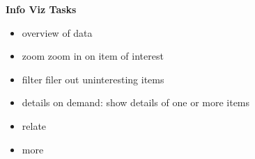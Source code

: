 \documentclass[]{article}
\begin{document}
\textbf{Info Viz Tasks}
\begin{itemize}
\setlength\itemsep{0em}
	\item overview of data
	\item zoom zoom in on item of interest
	\item  filter filer out uninteresting items
	\item details on demand: show details of one or more items
	\item relate
	\item more
\end{itemize}
\end{document}
